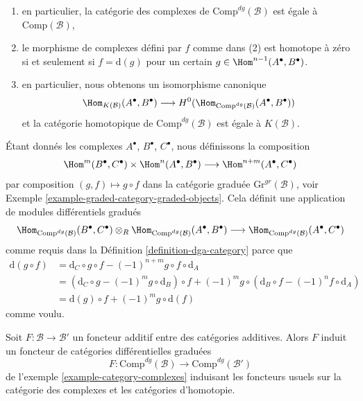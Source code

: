 \begin{example}
\begin{enumerate}
seulement si le morphisme $f : A^\bullet \to B^\bullet[n]$ d'objets gradués de
$\mathcal{B}$ est en fait un morphisme de complexes,
\item en particulier, la catégorie des complexes de
$\text{Comp}^{dg}(\mathcal{B})$ est égale à $\text{Comp}(\mathcal{B})$,
\item le morphisme de complexes défini par $f$ comme dans (2) est homotope
à zéro si et seulement si $f = \text{d}(g)$ pour un certain $g \in
\Hom^{n - 1}(A^\bullet, B^\bullet)$.
\item en particulier, nous obtenons un isomorphisme canonique
$$
\Hom_{K(\mathcal{B})}(A^\bullet, B^\bullet)
\longrightarrow
H^0(\Hom_{\text{Comp}^{dg}(\mathcal{B})}(A^\bullet, B^\bullet))
$$
et la catégorie homotopique de $\text{Comp}^{dg}(\mathcal{B})$ est égale à
$K(\mathcal{B})$.
\end{enumerate}
Étant donnés les complexes $A^\bullet$, $B^\bullet$, $C^\bullet$, nous définissons
la composition
$$
\Hom^m(B^\bullet, C^\bullet) \times \Hom^n(A^\bullet, B^\bullet)
\longrightarrow
\Hom^{n + m}(A^\bullet, C^\bullet)
$$
par composition $(g, f) \mapsto g \circ f$ dans la catégorie graduée
$\text{Gr}^{gr}(\mathcal{B})$, voir Exemple
\ref{example-graded-category-graded-objects}. Cela définit une application de
modules différentiels gradués
$$
\Hom_{\text{Comp}^{dg}(\mathcal{B})}(B^\bullet, C^\bullet)
\otimes_R
\Hom_{\text{Comp}^{dg}(\mathcal{B})}(A^\bullet, B^\bullet)
\longrightarrow
\Hom_{\text{Comp}^{dg}(\mathcal{B})}(A^\bullet, C^\bullet)
$$
comme requis dans la Définition \ref{definition-dga-category} parce que
\begin{align*}
\text{d}(g \circ f) & =
\text{d}_C \circ g \circ f - (-1)^{n + m} g \circ f \circ \text{d}_A \\
& =
\left(\text{d}_C \circ g - (-1)^m g \circ \text{d}_B\right) \circ f +
(-1)^m g \circ \left(\text{d}_B \circ f - (-1)^n f \circ \text{d}_A\right) \\
& =
\text{d}(g) \circ f + (-1)^m g \circ \text{d}(f)
\end{align*}
comme voulu.
\end{example}

\begin{lemma}
\label{lemma-additive-functor-induces-dga-functor}
Soit $F : \mathcal{B} \to \mathcal{B}'$ un foncteur additif entre des catégories
additives. Alors $F$ induit un foncteur de catégories différentielles graduées
$$
F : \text{Comp}^{dg}(\mathcal{B}) \to \text{Comp}^{dg}(\mathcal{B}')
$$
de l'exemple \ref{example-category-complexes} induisant les foncteurs usuels sur
la catégorie des complexes et les catégories d'homotopie.
\end{lemma}

